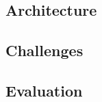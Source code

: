 \documentclass[11pt,a4paper]{article}
\begin{document}
\subsection{Architecture}




\subsection{Challenges}





\subsection{Evaluation}




\end{document}
